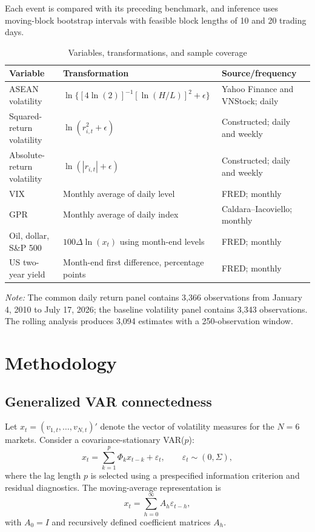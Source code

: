 \documentclass[12pt,a4paper]{article}
\begin{document}
Each event is compared with its preceding benchmark, and inference uses moving-block bootstrap intervals with feasible block lengths of 10 and 20 trading days.

\begin{table}[H]
\centering
\caption{Variables, transformations, and sample coverage}
\label{tab:variables}
\begin{tabular}{p{}p{}p{}}
\toprule
Variable & Transformation & Source/frequency \\
\midrule
ASEAN volatility & $\ln\{[4\ln(2)]^{-1}[\ln(H/L)]^2+\epsilon\}$ & Yahoo Finance and VNStock; daily \\
Squared-return volatility & $\ln(r_{i,t}^{2}+\epsilon)$ & Constructed; daily and weekly \\
Absolute-return volatility & $\ln(|r_{i,t}|+\epsilon)$ & Constructed; daily and weekly \\
VIX & Monthly average of daily level & FRED; monthly \\
GPR & Monthly average of daily index & Caldara--Iacoviello; monthly \\
Oil, dollar, S\&P 500 & $100\Delta\ln(x_t)$ using month-end levels & FRED; monthly \\
US two-year yield & Month-end first difference, percentage points & FRED; monthly \\
\bottomrule
\end{tabular}
\begin{minipage}{0.86\textwidth}
\footnotesize\textit{Note:} The common daily return panel contains 3,366 observations from January 4, 2010 to July 17, 2026; the baseline volatility panel contains 3,343 observations. The rolling analysis produces 3,094 estimates with a 250-observation window.
\end{minipage}
\end{table}

\section{Methodology}
\label{sec:method}

\subsection{Generalized VAR connectedness}

Let $x_t=(v_{1,t},\ldots,v_{N,t})'$ denote the vector of volatility measures for the $N=6$ markets. Consider a covariance-stationary VAR($p$):
\begin{equation}
 x_t=\sum_{k=1}^{p}\Phi_k x_{t-k}+\varepsilon_t,
 \qquad \varepsilon_t\sim(0,\Sigma),
 \label{eq:var}
\end{equation}
where the lag length $p$ is selected using a prespecified information criterion and residual diagnostics. The moving-average representation is
\begin{equation}
 x_t=\sum_{h=0}^{\infty}A_h\varepsilon_{t-h},
 \label{eq:ma}
\end{equation}
with $A_0=I$ and recursively defined coefficient matrices $A_h$.
\end{document}
